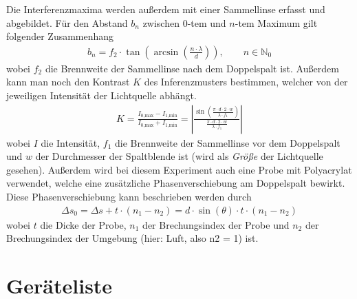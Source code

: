 \documentclass{article}
\begin{document}
Die Interferenzmaxima werden außerdem mit einer Sammellinse erfasst und abgebildet. Für den Abstand $b_n$ zwischen $0$-tem und $n$-tem Maximum gilt folgender Zusammenhang 
\begin{align}
b_n = f_2 \cdot \tan\left( \operatorname{arcsin}\left(\frac{n\cdot\lambda}{d}\right)\right), \qquad n\in\mathbb{N}_0
\end{align}
wobei $f_2$ die Brennweite der Sammellinse nach dem Doppelspalt ist. Außerdem kann man noch den Kontrast $K$ des Inferenzmusters bestimmen, welcher von der jeweiligen Intensität der Lichtquelle abhängt.
\begin{align}
K = \frac{I_\text{0,max}-I_\text{1,min}}{I_\text{0,max}+I_\text{1,min}} = \left| \frac{\sin\left(\frac{\pi\cdot d\cdot 2\cdot w}{\lambda\cdot f_1}\right)}{ \frac{\pi\cdot d\cdot 2\cdot w}{\lambda\cdot f_1} }\right|
 \label{eq:kontrast}
\end{align}
wobei $I$ die Intensität, $f_1$ die Brennweite der Sammellinse vor dem Doppelspalt und $w$ der Durchmesser der Spaltblende ist (wird als \textit{Größe} der Lichtquelle gesehen). Außerdem wird bei diesem Experiment auch eine Probe mit Polyacrylat verwendet, welche eine zusätzliche Phasenverschiebung am Doppelspalt bewirkt. Diese Phasenverschiebung kann beschrieben werden durch
\begin{align}
\Delta s_0 = \Delta s + t\cdot (n_1-n_2) = d\cdot\sin(\theta)\cdot t\cdot (n_1-n_2)
\end{align}
wobei $t$ die Dicke der Probe, $n_1$ der Brechungsindex der Probe und $n_2$ der Brechungsindex der Umgebung (hier: Luft, also n2 = 1) ist.







\section{Geräteliste}
\end{document}
